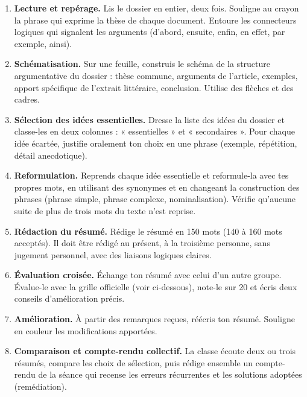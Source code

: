 \documentclass[11pt]{article}
\begin{document}
\begin{enumerate}
\item \textbf{Lecture et repérage.} Lis le dossier en entier, deux fois. Souligne au crayon la phrase qui exprime la thèse de chaque document. Entoure les connecteurs logiques qui signalent les arguments (d'abord, ensuite, enfin, en effet, par exemple, ainsi).
\item \textbf{Schématisation.} Sur une feuille, construis le schéma de la structure argumentative du dossier : thèse commune, arguments de l'article, exemples, apport spécifique de l'extrait littéraire, conclusion. Utilise des flèches et des cadres.
\item \textbf{Sélection des idées essentielles.} Dresse la liste des idées du dossier et classe-les en deux colonnes : « essentielles » et « secondaires ». Pour chaque idée écartée, justifie oralement ton choix en une phrase (exemple, répétition, détail anecdotique).
\item \textbf{Reformulation.} Reprends chaque idée essentielle et reformule-la avec tes propres mots, en utilisant des synonymes et en changeant la construction des phrases (phrase simple, phrase complexe, nominalisation). Vérifie qu'aucune suite de plus de trois mots du texte n'est reprise.
\item \textbf{Rédaction du résumé.} Rédige le résumé en 150 mots (140 à 160 mots acceptés). Il doit être rédigé au présent, à la troisième personne, sans jugement personnel, avec des liaisons logiques claires.
\item \textbf{Évaluation croisée.} Échange ton résumé avec celui d'un autre groupe. Évalue-le avec la grille officielle (voir ci-dessous), note-le sur 20 et écris deux conseils d'amélioration précis.
\item \textbf{Amélioration.} À partir des remarques reçues, réécris ton résumé. Souligne en couleur les modifications apportées.
\item \textbf{Comparaison et compte-rendu collectif.} La classe écoute deux ou trois résumés, compare les choix de sélection, puis rédige ensemble un compte-rendu de la séance qui recense les erreurs récurrentes et les solutions adoptées (remédiation).
\end{enumerate}
\end{document}
